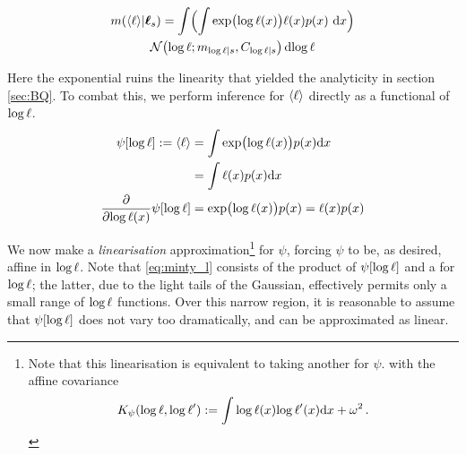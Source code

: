 \documentclass{article}
\begin{document}
%
%
%
\begin{multline}\label{eq:minty_l}
\mean{\inty{\lfn}}{\vr_s}
 =\int \Bigl( \int \exp\bigl(\tr(\lfv)\bigr)\lfn(\lfv)\po{\lfv}\,\ud\lfv\Bigr)\\
\N{\tr}{\meancondfn{\tr}{s}}{C_{\tr|s}} \ud \tr
\end{multline}

Here the exponential ruins the linearity that yielded the analyticity in section \ref{sec:BQ}. To combat this, we perform inference for $\inty{\lfn}$ directly as a functional of $\tr$.
%
\begin{align*}
 \psi[\tr] \deq \inty{\lfn} & = \int \exp \bigl( \tr(\lfv)\bigr) p(\lfv) \ud \lfv\\
  						    & = \int \lfn(\lfv) p(\lfv) \ud \lfv\\
\pderiv{}{\tr(\lfv)}\psi[\tr] & = \exp \bigl( \tr(\lfv)\bigr) p(\lfv)  = \lfn(\lfv) p(\lfv) 
\end{align*}

We now make a \emph{linearisation} approximation\footnote{Note that this linearisation is equivalent to taking another \gpb for $\psi$. with the affine covariance
\begin{equation*}
 K_\psi(\tr,\tr')
\deq
\int\tr(\lfv) \tr'(\lfv) \ud \lfv
+ \omega^2\,.
\end{equation*}
} 
for $\psi$, forcing $\psi$ to be, as desired, affine in $\tr$. 
Note that \eqref{eq:minty_l} consists of the product of $\psi[\tr]$ and a \gpb for $\tr$; the latter, due to the light tails of the Gaussian, effectively permits only a small range of $\tr$ functions. Over this narrow region, it is reasonable to assume that $\psi[\tr]$ does not vary too dramatically, and can be approximated as linear. 
\end{document}
